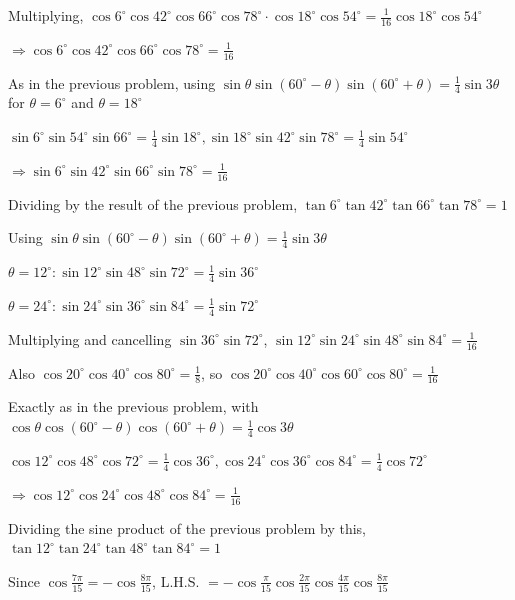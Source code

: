   Multiplying, $\cos 6^\circ\cos 42^\circ\cos 66^\circ\cos 78^\circ\cdot\cos 18^\circ\cos 54^\circ = \frac{1}{16}\cos
  18^\circ\cos 54^\circ$

  $\Rightarrow \cos 6^\circ\cos 42^\circ\cos 66^\circ\cos 78^\circ = \frac{1}{16}$

\item As in the previous problem, using $\sin\theta\sin(60^\circ - \theta)\sin(60^\circ + \theta) = \frac{1}{4}\sin 3\theta$
  for $\theta = 6^\circ$ and $\theta = 18^\circ$

  $\sin 6^\circ\sin 54^\circ\sin 66^\circ = \frac{1}{4}\sin 18^\circ, \sin 18^\circ\sin 42^\circ\sin 78^\circ =
  \frac{1}{4}\sin 54^\circ$

  $\Rightarrow \sin 6^\circ\sin 42^\circ\sin 66^\circ\sin 78^\circ = \frac{1}{16}$

  Dividing by the result of the previous problem, $\tan 6^\circ\tan 42^\circ\tan 66^\circ\tan 78^\circ = 1$

\item Using $\sin\theta\sin(60^\circ - \theta)\sin(60^\circ + \theta) = \frac{1}{4}\sin 3\theta$

  $\theta = 12^\circ: \sin 12^\circ\sin 48^\circ\sin 72^\circ = \frac{1}{4}\sin 36^\circ$

  $\theta = 24^\circ: \sin 24^\circ\sin 36^\circ\sin 84^\circ = \frac{1}{4}\sin 72^\circ$

  Multiplying and cancelling $\sin 36^\circ\sin 72^\circ$, $\sin 12^\circ\sin 24^\circ\sin 48^\circ\sin 84^\circ =
  \frac{1}{16}$

  Also $\cos 20^\circ\cos 40^\circ\cos 80^\circ = \frac{1}{8}$, so $\cos 20^\circ\cos 40^\circ\cos 60^\circ\cos 80^\circ =
  \frac{1}{16}$

\item Exactly as in the previous problem, with $\cos\theta\cos(60^\circ - \theta)\cos(60^\circ + \theta) = \frac{1}{4}\cos
  3\theta$

  $\cos 12^\circ\cos 48^\circ\cos 72^\circ = \frac{1}{4}\cos 36^\circ, \cos 24^\circ\cos 36^\circ\cos 84^\circ =
  \frac{1}{4}\cos 72^\circ$

  $\Rightarrow \cos 12^\circ\cos 24^\circ\cos 48^\circ\cos 84^\circ = \frac{1}{16}$

  Dividing the sine product of the previous problem by this, $\tan 12^\circ\tan 24^\circ\tan 48^\circ\tan 84^\circ = 1$

\item Since $\cos\frac{7\pi}{15} = -\cos\frac{8\pi}{15}$, L.H.S. $= -\cos\frac{\pi}{15}\cos\frac{2\pi}{15}\cos\frac{4\pi}{15}
  \cos\frac{8\pi}{15}$

